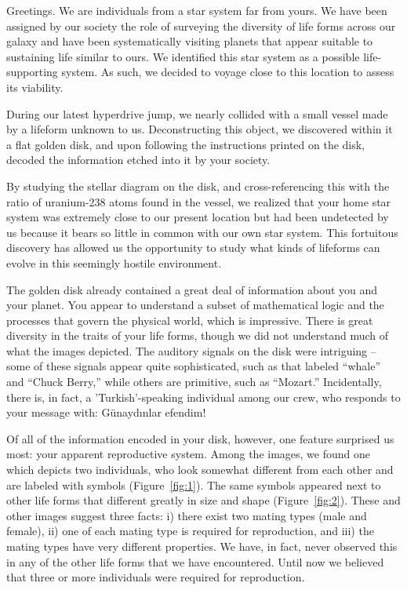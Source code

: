 
Greetings. We are individuals from a star system far from yours. We have been assigned by our society the role of surveying the diversity of life forms across our galaxy and have been systematically visiting planets that appear suitable to sustaining life similar to ours. We identified this star system as a possible life-supporting system. As such, we decided to voyage close to this location to assess its viability.

During our latest hyperdrive jump, we nearly collided with a small vessel made by a lifeform unknown to us. Deconstructing this object, we discovered within it a flat golden disk, and upon following the instructions printed on the disk, decoded the information etched into it by your society. 

By studying the stellar diagram on the disk, and cross-referencing this with the ratio of uranium-238 atoms found in the vessel, we realized that your home star system was extremely close to our present location but had been undetected by us because it bears so little in common with our own star system. This fortuitous discovery has allowed us the opportunity to study what kinds of lifeforms can evolve in this seemingly hostile environment. 

The golden disk already contained a great deal of information about you and your planet. You appear to understand a subset of mathematical logic and the processes that govern the physical world, which is impressive. There is great diversity in the traits of your life forms, though we did not understand much of what the images depicted. The auditory signals on the disk were intriguing -- some of these signals appear quite sophisticated, such as that labeled ``whale'' and ``Chuck Berry,'' while others are primitive, such as ``Mozart.'' Incidentally, there is, in fact, a 'Turkish'-speaking individual among our crew, who responds to your message with: Günaydınlar efendim!

Of all of the information encoded in your disk, however, one feature surprised us most: your apparent reproductive system. Among the images, we found one which depicts two individuals, who look somewhat different from each other and are labeled with symbols (Figure~\ref{fig:1}). The same symbols appeared next to other life forms that different greatly in size and shape (Figure~\ref{fig:2}). These and other images suggest three facts: i) there exist two mating types (male and female), ii) one of each mating type is required for reproduction, and iii) the mating types have very different properties. We have, in fact, never observed this in any of the other life forms that we have encountered. Until now we believed that three or more individuals were required for reproduction.

